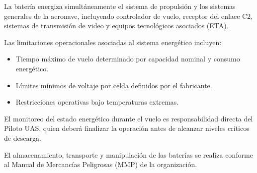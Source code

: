 La batería energiza simultáneamente el sistema de propulsión y los sistemas generales de la aeronave, incluyendo controlador de vuelo, receptor del enlace C2, sistemas de transmisión de video y equipos tecnológicos asociados (ETA).

Las limitaciones operacionales asociadas al sistema energético incluyen:

\begin{itemize}
    \item Tiempo máximo de vuelo determinado por capacidad nominal y consumo energético.
    \item Límites mínimos de voltaje por celda definidos por el fabricante.
    \item Restricciones operativas bajo temperaturas extremas.
\end{itemize}

El monitoreo del estado energético durante el vuelo es responsabilidad directa del Piloto UAS, quien deberá finalizar la operación antes de alcanzar niveles críticos de descarga.

El almacenamiento, transporte y manipulación de las baterías se realiza conforme al Manual de Mercancías Peligrosas (MMP) de la organización.
